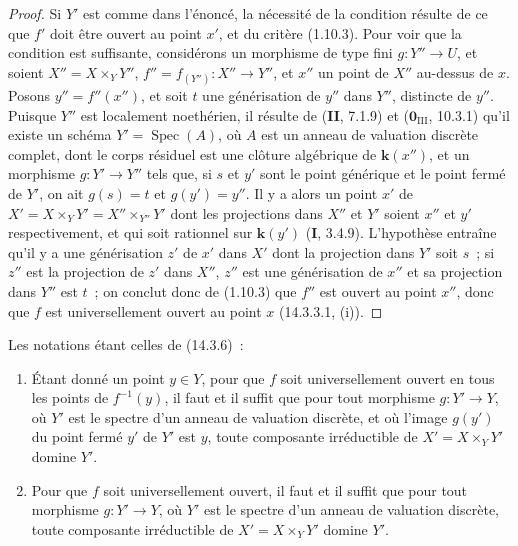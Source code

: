 \begin{proof}
Si $Y'$ est comme dans l'énoncé, la nécessité de la condition résulte de ce que
$f'$ doit être ouvert au point $x'$, et du critère (1.10.3). Pour voir que la
condition est suffisante, considérons un morphisme de type fini $g:Y''\to U$, et
soient $X''=X\times_Y Y''$, $f''=f_{(Y'')}:X''\to Y''$, et $x''$ un point de $X''$
au-dessus de $x$. Posons $y''=f''(x'')$, et soit $t$ une générisation de $y''$
dans $Y''$, distincte de $y''$. Puisque $Y''$ est localement noethérien, il
résulte de (\textbf{II}, 7.1.9) et ($\mathbf{0}_{\mathrm{III}}$, 10.3.1) qu'il
existe un schéma $Y'=\operatorname{Spec}(A)$, où $A$ est un anneau de valuation
discrète complet, dont le corps résiduel est une clôture algébrique de $\boldsymbol{k}(x'')$,
et un morphisme $g:Y'\to Y''$ tels que, si $s$ et $y'$ sont le point générique et
le point fermé de $Y'$, on ait $g(s)=t$ et $g(y')=y''$. Il y a alors un point $x'$
de $X'=X\times_Y Y'=X''\times_{Y''}Y'$ dont les projections dans $X''$ et $Y'$
soient $x''$ et $y'$ respectivement, et qui soit rationnel sur $\boldsymbol{k}(y')$ (\textbf{I}, 3.4.9).
L'hypothèse entraîne qu'il y a une générisation $z'$ de $x'$ dans $X'$ dont la
projection dans $Y'$ soit $s$~; si $z''$ est la projection de $z'$ dans $X''$,
$z''$ est une générisation de $x''$ et sa projection dans $Y''$ est $t$~; on
conclut donc de (1.10.3) que $f''$ est ouvert au point $x''$, donc que $f$ est
universellement ouvert au point $x$ (14.3.3.1, (i)).
\end{proof}

\begin{corollary}[14.3.7]
\label{IV.14.3.7-fr}
Les notations étant celles de \textup{(14.3.6)}~:
\begin{enumerate}[label=\textup{(\roman*)}]
  \item Étant donné un point $y\in Y$, pour que $f$ soit universellement ouvert en
  tous les points de $f^{-1}(y)$, il faut et il suffit que pour tout morphisme
  $g:Y'\to Y$, où $Y'$ est le spectre d'un anneau de valuation discrète, et où
  l'image $g(y')$ du point fermé $y'$ de $Y'$ est $y$, toute composante
  irréductible de $X'=X\times_Y Y'$ domine $Y'$.
  \item Pour que $f$ soit universellement ouvert, il faut et il suffit que pour
  tout morphisme $g:Y'\to Y$, où $Y'$ est le spectre d'un anneau de valuation
  discrète, toute composante irréductible de $X'=X\times_Y Y'$ domine $Y'$.
\end{enumerate}
\end{corollary}

